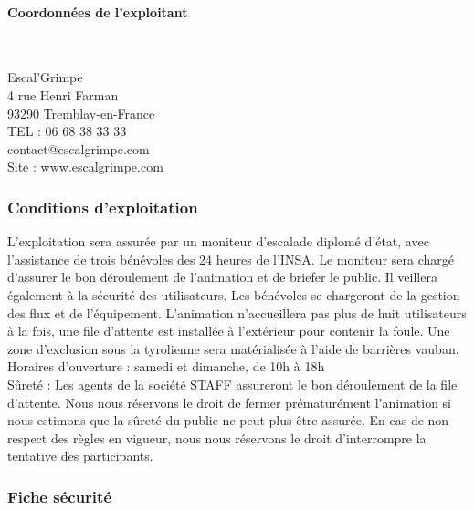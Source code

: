 \documentclass[hidelinks, paper=a4, fontsize=13pt]{report}
\begin{document}
\newpage 
\paragraph{Coordonnées de l'exploitant}\mbox{}\\
\begin{center}
Escal'Grimpe\\
4 rue Henri Farman\\
93290 Tremblay-en-France \\
TEL : 06 68 38 33 33\\
contact@escalgrimpe.com\\
Site : www.escalgrimpe.com\\
\end{center}

\subsubsection{Conditions d’exploitation}
L’exploitation sera assurée par un moniteur d’escalade diplomé d’état, avec l’assistance de trois bénévoles des 24 heures de l’INSA. Le moniteur sera chargé d’assurer le bon déroulement de l’animation et de briefer le public. Il veillera également à la sécurité des utilisateurs. Les bénévoles se chargeront de la gestion des flux et de l’équipement. L’animation n'accueillera pas plus de huit utilisateurs à la fois, une file d’attente est installée à l’extérieur pour contenir la foule. Une zone d'exclusion sous la tyrolienne sera matérialisée à l'aide de barrières vauban.  \\

Horaires d’ouverture : samedi et dimanche, de 10h à 18h \\

Sûreté : Les agents de la société STAFF assureront le bon déroulement de la file d’attente. Nous nous réservons le droit de fermer prématurément l’animation si nous estimons que la sûreté du public ne peut plus être assurée. En cas de non respect des règles en vigueur, nous nous réservons le droit d’interrompre la tentative des participants. \\


\subsubsection{Fiche sécurité}
\end{document}
